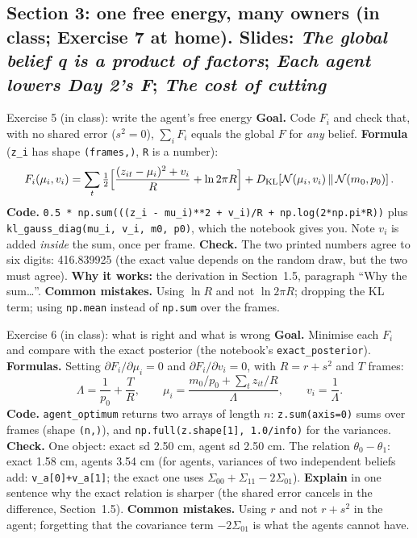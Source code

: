 \documentclass[11pt]{article}
\begin{document}
\subsection*{Section 3: one free energy, many owners (in class; Exercise 7 at home). Slides: \emph{The global belief q is a product of factors}; \emph{Each agent lowers Day 2's F}; \emph{The cost of cutting}}

\begin{labhelp}{Exercise 5 (in class): write the agent's free energy}
\textbf{Goal.} Code $F_i$ and check that, with no shared error ($s^2=0$), $\sum_iF_i$ equals the global $F$ for \emph{any} belief. \textbf{Formula} (\texttt{z\_i} has shape \texttt{(frames,)}, \texttt{R} is a number):
\[
F_i(\mu_i,v_i)=\sum_t\tfrac12\Big[\frac{(z_{it}-\mu_i)^2+v_i}{R}+\ln 2\pi R\Big]+D_{\mathrm{KL}}\!\left[\mathcal{N}(\mu_i,v_i)\,\middle\|\,\mathcal{N}(m_0,p_0)\right] .
\]
\textbf{Code.} \texttt{0.5 * np.sum(((z\_i - mu\_i)**2 + v\_i)/R + np.log(2*np.pi*R))} plus \texttt{kl\_gauss\_diag(mu\_i, v\_i, m0, p0)}, which the notebook gives you. Note $v_i$ is added \emph{inside} the sum, once per frame. \textbf{Check.} The two printed numbers agree to six digits: 416.839925 (the exact value depends on the random draw, but the two must agree). \textbf{Why it works:} the derivation in Section~1.5, paragraph ``Why the sum\ldots''. \textbf{Common mistakes.} Using $\ln R$ and not $\ln 2\pi R$; dropping the KL term; using \texttt{np.mean} instead of \texttt{np.sum} over the frames.
\end{labhelp}

\begin{labhelp}{Exercise 6 (in class): what is right and what is wrong}
\textbf{Goal.} Minimise each $F_i$ and compare with the exact posterior (the notebook's \texttt{exact\_posterior}). \textbf{Formulas.} Setting $\partial F_i/\partial\mu_i=0$ and $\partial F_i/\partial v_i=0$, with $R=r+s^2$ and $T$ frames:
\[
\Lambda=\frac1{p_0}+\frac TR,\qquad \mu_i=\frac{m_0/p_0+\sum_t z_{it}/R}{\Lambda},\qquad v_i=\frac1\Lambda .
\]
\textbf{Code.} \texttt{agent\_optimum} returns two arrays of length $n$: \texttt{z.sum(axis=0)} sums over frames (shape \texttt{(n,)}), and \texttt{np.full(z.shape[1], 1.0/info)} for the variances. \textbf{Check.} One object: exact sd 2.50 cm, agent sd 2.50 cm. The relation $\theta_0-\theta_1$: exact 1.58 cm, agents 3.54 cm (for agents, variances of two independent beliefs add: \texttt{v\_a[0]+v\_a[1]}; the exact one uses $\Sigma_{00}+\Sigma_{11}-2\Sigma_{01}$). \textbf{Explain} in one sentence why the exact relation is sharper (the shared error cancels in the difference, Section~1.5). \textbf{Common mistakes.} Using $r$ and not $r+s^2$ in the agent; forgetting that the covariance term $-2\Sigma_{01}$ is what the agents cannot have.
\end{labhelp}
\end{document}
